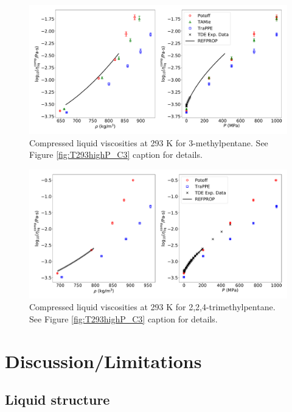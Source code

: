\documentclass[preprint,review,12pt]{elsarticle}
\begin{document}
	\begin{figure}[htb!]
		\centering
		\includegraphics[width=6.4in]{compare_REFPROP_T293highP_3MPentane.pdf}
		\caption{Compressed liquid viscosities at 293 K for 3-methylpentane. See Figure \ref{fig:T293highP_C3} caption for details.}
		\label{fig:T293highP_3MP}
	\end{figure} 
	
	\begin{figure}[htb!]
		\centering
		\includegraphics[width=6.4in]{compare_REFPROP_T293highP_IC8H18.pdf}
		\caption{Compressed liquid viscosities at 293 K for 2,2,4-trimethylpentane. See Figure \ref{fig:T293highP_C3} caption for details.}
		\label{fig:T293highP_IC8}
	\end{figure} 
	
	\section{Discussion/Limitations} \label{Discussion/Limitations}
	
	\subsection{Liquid structure} \label{sec:RDF}
	
\end{document}
